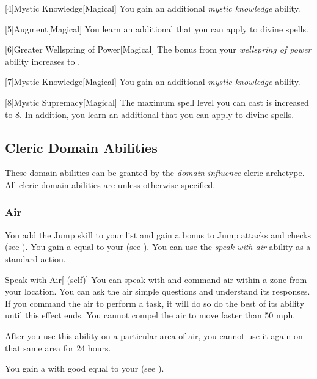         [4]{Mystic Knowledge}[Magical]
        You gain an additional \textit{mystic knowledge} ability.

        [5]{Augment}[Magical]
        You learn an additional  that you can apply to divine spells.

        [6]{Greater Wellspring of Power}[Magical]
        The bonus from your \textit{wellspring of power} ability increases to .

        [7]{Mystic Knowledge}[Magical]
        You gain an additional \textit{mystic knowledge} ability.

        [8]{Mystic Supremacy}[Magical]
        The maximum spell level you can cast is increased to 8.
        In addition, you learn an additional  that you can apply to divine spells.

    \subsection{Cleric Domain Abilities}\label{Cleric Domain Abilities}
        These domain abilities can be granted by the \textit{domain influence} cleric archetype.
        All cleric domain abilities are  unless otherwise specified.

        \subsubsection{Air}
             You add the Jump skill to your  list and gain a  bonus to Jump attacks and checks (see ).
             You gain a  equal to your  (see ).
             You can use the \textit{speak with air} ability as a standard action.
            \begin{attuneability}{Speak with Air}[ (self)]
                You can speak with and command air within a \areahuge zone from your location.
                You can ask the air simple questions and understand its responses.
                If you command the air to perform a task, it will do so do the best of its ability until this effect ends.
                You cannot compel the air to move faster than 50 mph.

                After you use this ability on a particular area of air, you cannot use it again on that same area for 24 hours.
            \end{attuneability}
             You gain a  with good  equal to your  (see ).

